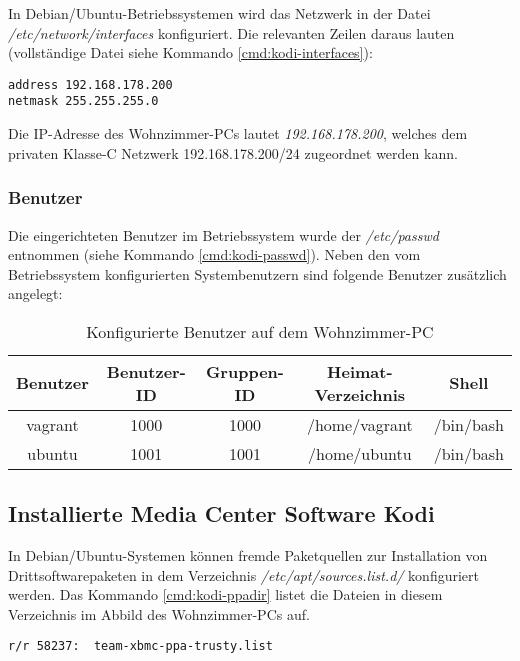 In Debian/Ubuntu-Betriebssystemen wird das Netzwerk in der Datei \textit{/etc/network/interfaces} konfiguriert. Die relevanten Zeilen daraus lauten (vollständige Datei siehe Kommando \autoref{cmd:kodi-interfaces}):

\begin{verbatim}
address 192.168.178.200
netmask 255.255.255.0
\end{verbatim}

Die IP-Adresse des Wohnzimmer-PCs lautet \textit{192.168.178.200}, welches dem privaten \mbox{Klasse-C} Netzwerk 192.168.178.200/24 zugeordnet werden kann.

\subsubsection{Benutzer}
\label{sec:kodi-users}

Die eingerichteten Benutzer im Betriebssystem wurde der \textit{/etc/passwd} entnommen (siehe Kommando \autoref{cmd:kodi-passwd}). Neben den vom Betriebssystem konfigurierten Systembenutzern sind folgende Benutzer zusätzlich angelegt:

\begin{table}[H]
\centering
\begin{tabular}{ccccc}
\hline 
Benutzer & Benutzer-ID & Gruppen-ID & Heimat-Verzeichnis & Shell \\ 
\hline 
vagrant & 1000 & 1000 & /home/vagrant & /bin/bash \\ 
\hline 
ubuntu & 1001 & 1001 & /home/ubuntu & /bin/bash \\ 
\hline 
\end{tabular} 
\caption{Konfigurierte Benutzer auf dem Wohnzimmer-PC}
\end{table}

\subsection{Installierte Media Center Software Kodi}

In Debian/Ubuntu-Systemen können fremde Paketquellen zur Installation von Drittsoftwarepaketen in dem Verzeichnis \textit{/etc/apt/sources.list.d/} konfiguriert werden. Das Kommando \autoref{cmd:kodi-ppadir} listet die Dateien in diesem Verzeichnis im Abbild des Wohnzimmer-PCs auf.

\begin{cmd}[H]
\begin{verbatim}
r/r 58237:	team-xbmc-ppa-trusty.list
\end{verbatim}
\caption{fls -o 2048 kodi.raw 1289}
\label{cmd:kodi-ppadir}
\end{cmd}

